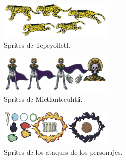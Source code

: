 \begin{figure}[h]
    \centering
    \includegraphics[width=0.50\textwidth]{Anexos/disenios/Tepeyollotl.png}
    \caption{Sprites de Tepeyollotl.}
    \label{fig:Tepeyollotl}
\end{figure}

\begin{figure}[h]
    \centering
    \includegraphics[width=0.50\textwidth]{Anexos/disenios/Mictlantecuhtli.png}
    \caption{Sprites de Mictlantecuhtli.}
    \label{fig:Mictlantecuhtli}
\end{figure}

\begin{figure}[h]
    \centering
    \includegraphics[width=0.50\textwidth]{Anexos/disenios/Ataques.png}
    \caption{Sprites de los ataques de los personajes.}
    \label{fig:Mictlantecuhtli}
\end{figure}